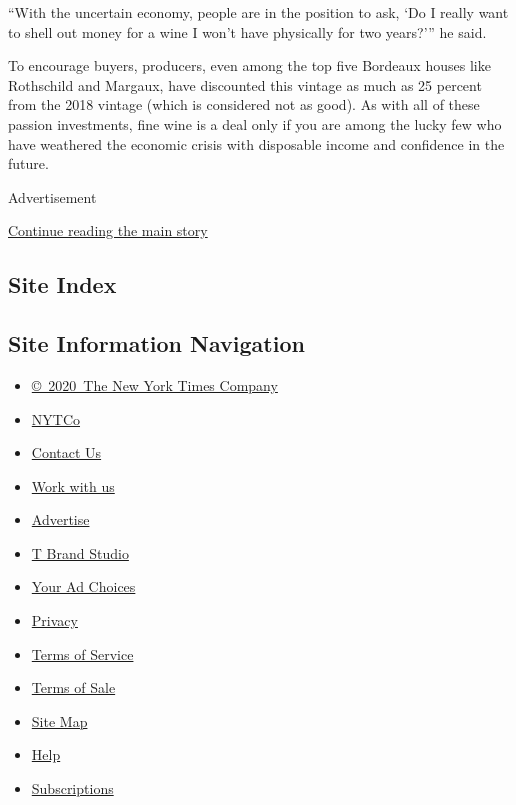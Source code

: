 ``With the uncertain economy, people are in the position to ask, `Do I
really want to shell out money for a wine I won't have physically for
two years?''' he said.

To encourage buyers, producers, even among the top five Bordeaux houses
like Rothschild and Margaux, have discounted this vintage as much as 25
percent from the 2018 vintage (which is considered not as good). As with
all of these passion investments, fine wine is a deal only if you are
among the lucky few who have weathered the economic crisis with
disposable income and confidence in the future.

Advertisement

\protect\hyperlink{after-bottom}{Continue reading the main story}

\hypertarget{site-index}{%
\subsection{Site Index}\label{site-index}}

\hypertarget{site-information-navigation}{%
\subsection{Site Information
Navigation}\label{site-information-navigation}}

\begin{itemize}
\tightlist
\item
  \href{https://help.nytimes3xbfgragh.onion/hc/en-us/articles/115014792127-Copyright-notice}{©~2020~The
  New York Times Company}
\end{itemize}

\begin{itemize}
\tightlist
\item
  \href{https://www.nytco.com/}{NYTCo}
\item
  \href{https://help.nytimes3xbfgragh.onion/hc/en-us/articles/115015385887-Contact-Us}{Contact
  Us}
\item
  \href{https://www.nytco.com/careers/}{Work with us}
\item
  \href{https://nytmediakit.com/}{Advertise}
\item
  \href{http://www.tbrandstudio.com/}{T Brand Studio}
\item
  \href{https://www.nytimes3xbfgragh.onion/privacy/cookie-policy\#how-do-i-manage-trackers}{Your
  Ad Choices}
\item
  \href{https://www.nytimes3xbfgragh.onion/privacy}{Privacy}
\item
  \href{https://help.nytimes3xbfgragh.onion/hc/en-us/articles/115014893428-Terms-of-service}{Terms
  of Service}
\item
  \href{https://help.nytimes3xbfgragh.onion/hc/en-us/articles/115014893968-Terms-of-sale}{Terms
  of Sale}
\item
  \href{https://spiderbites.nytimes3xbfgragh.onion}{Site Map}
\item
  \href{https://help.nytimes3xbfgragh.onion/hc/en-us}{Help}
\item
  \href{https://www.nytimes3xbfgragh.onion/subscription?campaignId=37WXW}{Subscriptions}
\end{itemize}
